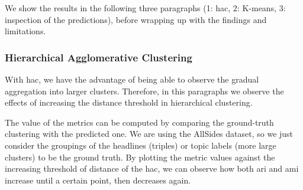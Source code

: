 
We show the results in the following three paragraphs (1: \acrshort{hac}, 2: K-means, 3: inspection of the predictions), before wrapping up with the findings and limitations. %





\subsubsection{Hierarchical Agglomerative Clustering}

With \acrshort{hac}, we have the advantage of being able to observe the gradual aggregation into larger clusters.
Therefore, in this paragraphs we observe the effects of increasing the distance threshold in hierarchical clustering.

The value of the metrics can be computed by comparing the ground-truth clustering with the predicted one.
We are using the AllSides dataset, so we just consider the groupings of the headlines (triples) or topic labels (more large clusters) to be the ground truth.
By plotting the metric values against the increasing threshold of distance of the \acrshort{hac}, we can observe how both \acrshort{ari} and \acrshort{ami} increase until a certain point, then decreases again.


